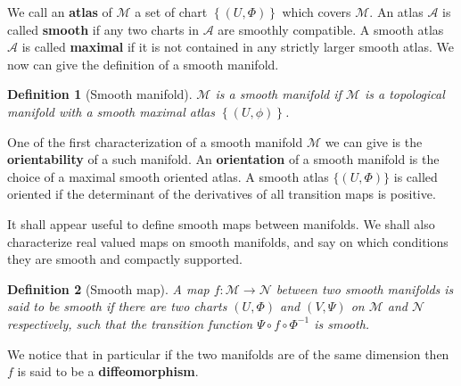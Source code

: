 \documentclass[10pt]{book}
\newcommand{\Acal}{\mathcal{A}}
\newcommand{\Mcal}{\mathcal{M}}
\newcommand{\Ncal}{\mathcal{N}}
\theoremstyle{break}
\newtheorem{definition}{Definition}
\begin{document}
\bigskip


We call an \textbf{atlas} of $\Mcal$ a set of chart $\left\{ (U, \Phi) \right\}$ which covers $\Mcal$. An atlas $\Acal$ is called \textbf{smooth}  if any two charts in $\Acal$ are smoothly compatible. A smooth atlas $\Acal$ is called \textbf{maximal}  if it is not contained in any strictly larger smooth atlas. We now can give the definition of a smooth manifold.


\begin{definition}[Smooth manifold]
$\Mcal$ is a smooth manifold if $\Mcal$ is a topological manifold with a smooth maximal atlas $\left\{(U,\phi)\right\}$.
\end{definition}


One of the first characterization of a smooth manifold $\Mcal$ we can give is the \textbf{orientability} of a such manifold. An \textbf{orientation} of a smooth manifold is the choice of a maximal smooth oriented atlas. A smooth atlas $\{(U,\Phi)\}$ is called oriented if the determinant of the derivatives of all transition maps is positive.


\bigskip


It shall appear useful to define smooth maps between manifolds. We shall also characterize real valued maps on smooth manifolds, and say on which conditions they are smooth and compactly supported.


\begin{definition}[Smooth map]
A map $f : \Mcal \to \Ncal$ between two smooth manifolds is said to be smooth if there are two charts $(U,\Phi)$ and $(V,\Psi)$ on $\Mcal$ and $\Ncal$ respectively, such that the transition function $\Psi \circ f \circ \Phi^{-1}$ is  smooth.
\end{definition}


We notice that in particular if the two manifolds are of the same dimension then $f$ is said to be a \textbf{diffeomorphism}.
\end{document}
